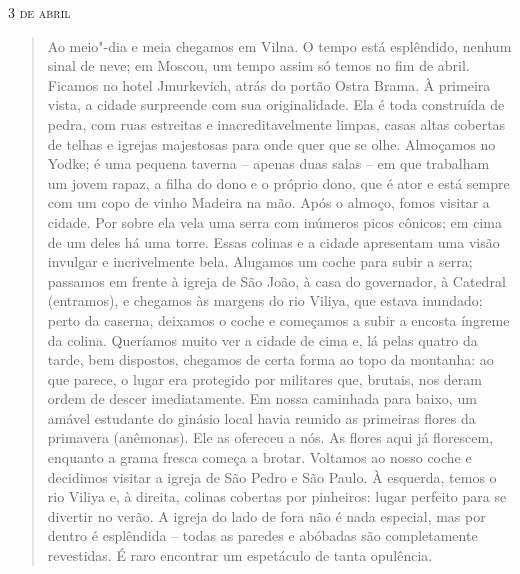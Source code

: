 \begin{flushright}
\smallskip\hfill\textsc{3 de abril}
\end{flushright}
\begin{quote}
Ao meio"-dia e meia chegamos em Vilna. O tempo está esplêndido, nenhum
sinal de neve; em Moscou, um tempo assim só temos no fim de abril.
Ficamos no hotel Jmurkevich, atrás do portão Ostra Brama. À primeira
vista, a cidade surpreende com sua originalidade. Ela é toda construída
de pedra, com ruas estreitas e inacreditavelmente limpas, casas altas
cobertas de telhas e igrejas majestosas para onde quer que se olhe.
Almoçamos no Yodke; é uma pequena taverna -- apenas duas salas -- em que
trabalham um jovem rapaz, a filha do dono e o próprio dono, que é ator e
está sempre com um copo de vinho Madeira na mão. Após o almoço, fomos
visitar a cidade. Por sobre ela vela uma serra com inúmeros picos
cônicos; em cima de um deles há uma torre. Essas colinas e a cidade
apresentam uma visão invulgar e incrivelmente bela. Alugamos um coche
para subir a serra; passamos em frente à igreja de São João, à casa do
governador, à Catedral (entramos), e chegamos às margens do rio Viliya,
que estava inundado; perto da caserna, deixamos o coche e começamos a
subir a encosta íngreme da colina. Queríamos muito ver a cidade de cima
e, lá pelas quatro da tarde, bem dispostos, chegamos de certa forma ao
topo da montanha: ao que parece, o lugar era protegido por militares
que, brutais, nos deram ordem de descer imediatamente. Em nossa
caminhada para baixo, um amável estudante do ginásio local havia reunido
as primeiras flores da primavera (anêmonas). Ele as ofereceu a nós. As
flores aqui já florescem, enquanto a grama fresca começa a brotar.
Voltamos ao nosso coche e decidimos visitar a igreja de São Pedro e São
Paulo. À esquerda, temos o rio Viliya e, à direita, colinas cobertas por
pinheiros: lugar perfeito para se divertir no verão. A igreja do lado de
fora não é nada especial, mas por dentro é esplêndida -- todas as paredes
e abóbadas são completamente revestidas. É raro encontrar um espetáculo
de tanta opulência.
\end{quote}

